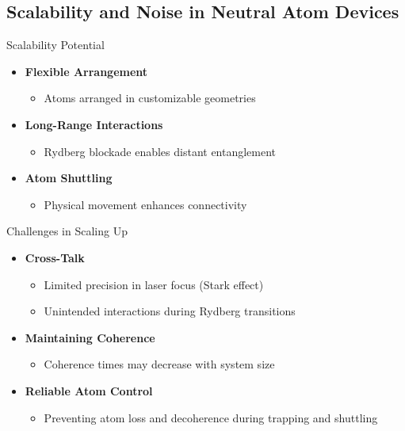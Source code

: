 \documentclass{beamer}
\begin{document}
\subsection{Scalability and Noise in Neutral Atom Devices}
\begin{frame}{Scalability Potential}
  \begin{itemize}
    \item \textbf{Flexible Arrangement}
      \begin{itemize}
        \item Atoms arranged in customizable geometries
      \end{itemize}
    \item \textbf{Long-Range Interactions}
      \begin{itemize}
        \item Rydberg blockade enables distant entanglement
      \end{itemize}
    \item \textbf{Atom Shuttling}
      \begin{itemize}
        \item Physical movement enhances connectivity
      \end{itemize}
  \end{itemize}
\end{frame}

\begin{frame}{Challenges in Scaling Up}
  \begin{itemize}
    \item \textbf{Cross-Talk}
      \begin{itemize}
        \item Limited precision in laser focus (Stark effect)
        \item Unintended interactions during Rydberg transitions
      \end{itemize}
    \item \textbf{Maintaining Coherence}
      \begin{itemize}
        \item Coherence times may decrease with system size
      \end{itemize}
    \item \textbf{Reliable Atom Control}
      \begin{itemize}
        \item Preventing atom loss and decoherence during trapping and shuttling
      \end{itemize}
  \end{itemize}
\end{frame}
\end{document}
